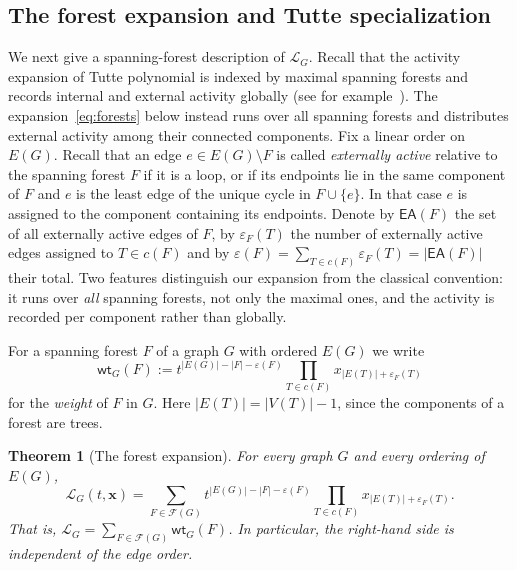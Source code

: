 \documentclass[11pt]{article}
\theoremstyle{plain}
\newtheorem{theorem}{Theorem}[section]
\theoremstyle{definition}
\renewcommand{\mathcal}{\mathscr}
\newcommand{\ds}{\displaystyle}
\newcommand{\LL}{\mathcal{L}}    %
\newcommand{\cF}{\mathcal{F}}    %
\newcommand{\bx}{\mathbf{x}}
\newcommand{\EA}{\mathsf{EA}} %
\newcommand{\wt}{\mathsf{wt}}
\newcommand{\eps}{\varepsilon}
\numberwithin{equation}{section}
\begin{document}
\subsection{The forest expansion and Tutte specialization} \label{subsec:forest-expansion}

We next give a spanning-forest description of $\LL_G$.  Recall that the activity expansion of Tutte polynomial
is indexed by maximal spanning forests and records internal and external activity globally (see for example~\cite{Tu2,EM}).
The expansion~\eqref{eq:forests} below instead runs over all spanning forests and distributes
external activity among their connected components.
Fix a linear order on $E(G)$. Recall that an edge $e\in E(G)\setminus F$ is called \emph{externally active}
relative to the spanning forest $F$ if it is a loop, or if its endpoints lie
in the same component of $F$ and $e$ is the least edge of the unique cycle in
$F\cup\{e\}$.  In that case $e$ is assigned to the component containing its endpoints.
Denote by $\EA(F)$ the set of all externally active edges of $F$, by $\eps_F(T)$ the number of
externally active edges assigned to $T\in c(F)$ and by
$\ds \eps(F)=\sum_{T\in c(F)}\eps_F(T)=|\EA(F)|  $
their total.  Two features distinguish our expansion from the classical convention: it
runs over \emph{all} spanning forests, not only the maximal ones, and the activity is recorded
per component rather than globally.
\medskip

For a spanning forest $F$ of a graph $G$ with ordered $E(G)$ we write
\begin{equation}\label{eq:forest-weight}
 \wt_G(F)  :=  t^{|E(G)|-|F|-\eps(F)}
 \prod_{T\in c(F)} x_{|E(T)|+\eps_F(T)}
\end{equation}
for the \emph{weight} of $F$ in $G$. Here $|E(T)|=|V(T)|-1$, since the components of a forest are trees.

\begin{theorem}[The forest expansion]\label{thm:forests-sum}
For every graph $G$ and every ordering of $E(G)$,
\begin{equation}\label{eq:forests}
  \LL_G(t,\bx) = \sum_{F\in\cF(G)}  t^{|E(G)|-|F|-\eps(F)}
  \prod_{T\in c(F)}  x_{|E(T)|+\eps_F(T)}.
\end{equation}
That is, $\ds \LL_G=\sum_{F\in\cF(G)}\wt_G(F)$.
In particular, the right-hand side is independent of the edge order.
\end{theorem}
\end{document}
